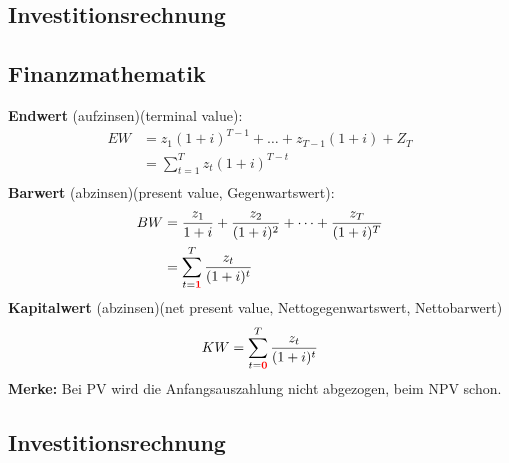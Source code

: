 \documentclass[leqno]{scrartcl}
\begin{document}
\begin{multicols}{4}
\section{Investitionsrechnung}

\subsection{Finanzmathematik}

\textbf{Endwert} (aufzinsen)(terminal value):
  \begin{equation*}
    \begin{split}
      EW &= z_1(1+i)^{T-1} + \dots + z_{T-1}(1+i) + Z_T \\
        &= \sum^T_{t=1} z_t (1+i)^{T-t}\\
    \end{split}
  \end{equation*}
\textbf{Barwert} (abzinsen)(present value, Gegenwartswert):
  \begin{equation*}
    \begin{split}
      BW &= \frac{z_1}{1+i}+\frac{z_2}{(1+i)^2}+\dots+\frac{z_T}{(1+i)^T}\\
          &= \sum^T_{t=\color{red}{\textbf{1}}}\frac{z_t}{(1+i)^t}\\
    \end{split}
  \end{equation*}
\textbf{Kapitalwert} (abzinsen)(net present value‚ Nettogegenwartswert, Nettobarwert)
  \begin{equation*}
    KW = \sum^T_{t=\color{red}{\textbf{0}}}\frac{z_t}{(1+i)^t}
  \end{equation*}
\textbf{Merke:} Bei PV wird die Anfangsauszahlung nicht abgezogen, beim NPV schon.

\subsection{Investitionsrechnung}


\end{multicols}
\end{document}
